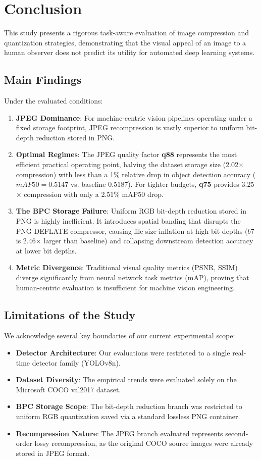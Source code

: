 \documentclass[12pt, a4paper]{article}
\begin{document}
\section{Conclusion}
This study presents a rigorous task-aware evaluation of image compression and quantization strategies, demonstrating that the visual appeal of an image to a human observer does not predict its utility for automated deep learning systems.

\subsection{Main Findings}
Under the evaluated conditions:
\begin{enumerate}
    \item \textbf{JPEG Dominance}: For machine-centric vision pipelines operating under a fixed storage footprint, JPEG recompression is vastly superior to uniform bit-depth reduction stored in PNG.
    \item \textbf{Optimal Regimes}: The JPEG quality factor \textbf{q88} represents the most efficient practical operating point, halving the dataset storage size (2.02$\times$ compression) with less than a 1\% relative drop in object detection accuracy ($mAP50 = 0.5147$ vs. baseline $0.5187$). For tighter budgets, \textbf{q75} provides 3.25$\times$ compression with only a 2.51\% mAP50 drop.
    \item \textbf{The BPC Storage Failure}: Uniform RGB bit-depth reduction stored in PNG is highly inefficient. It introduces spatial banding that disrupts the PNG DEFLATE compressor, causing file size inflation at high bit depths ($b7$ is 2.46$\times$ larger than baseline) and collapsing downstream detection accuracy at lower bit depths.
    \item \textbf{Metric Divergence}: Traditional visual quality metrics (PSNR, SSIM) diverge significantly from neural network task metrics (mAP), proving that human-centric evaluation is insufficient for machine vision engineering.
\end{enumerate}

\subsection{Limitations of the Study}
We acknowledge several key boundaries of our current experimental scope:
\begin{itemize}
    \item \textbf{Detector Architecture}: Our evaluations were restricted to a single real-time detector family (YOLOv8n).
    \item \textbf{Dataset Diversity}: The empirical trends were evaluated solely on the Microsoft COCO val2017 dataset.
    \item \textbf{BPC Storage Scope}: The bit-depth reduction branch was restricted to uniform RGB quantization saved via a standard lossless PNG container.
    \item \textbf{Recompression Nature}: The JPEG branch evaluated represents second-order lossy recompression, as the original COCO source images were already stored in JPEG format.
\end{itemize}
\end{document}
